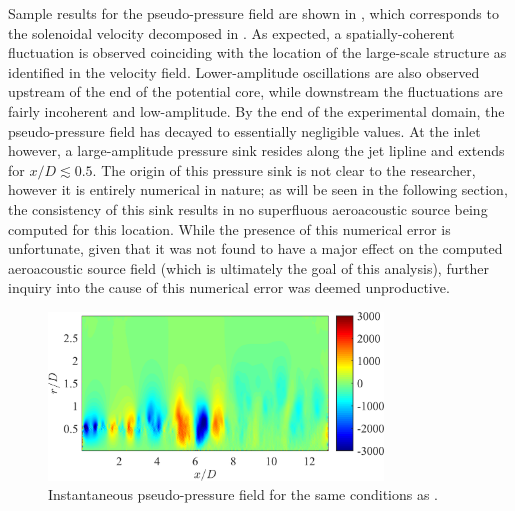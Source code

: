 Sample results for the pseudo-pressure field are shown in , which corresponds to the solenoidal velocity decomposed in .
As expected, a spatially-coherent fluctuation is observed coinciding with the location of the large-scale structure as identified in the velocity field.
Lower-amplitude oscillations are also observed upstream of the end of the potential core, while downstream the fluctuations are fairly incoherent and low-amplitude.
By the end of the experimental domain, the pseudo-pressure field has decayed to essentially negligible values.
At the inlet however, a large-amplitude pressure sink resides along the jet lipline and extends for $x/D \lesssim 0.5$.
The origin of this pressure sink is not clear to the researcher, however it is entirely numerical in nature; as will be seen in the following section, the consistency of this sink results in no superfluous aeroacoustic source being computed for this location.
While the presence of this numerical error is unfortunate, given that it was not found to have a major effect on the computed aeroacoustic source field (which is ultimately the goal of this analysis), further inquiry into the cause of this numerical error was deemed unproductive.
\begin{figure}
	\centering
	\includegraphics[width = 3.5in]{Figures/ch5_valid_Inst_ps.png}
	\caption{Instantaneous pseudo-pressure field for the same conditions as .}
	\label{fig:valid_pseudopressure}
\end{figure}


